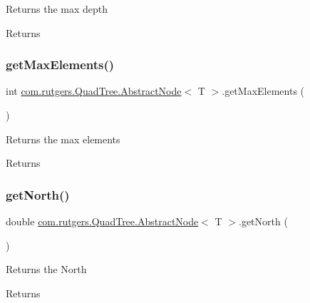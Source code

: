 Returns the max depth

\begin{DoxyReturn}{Returns}

\end{DoxyReturn}
\mbox{\label{classcom_1_1rutgers_1_1QuadTree_1_1AbstractNode_af9a2b6025ac383b8ca8fd480519cde8a}} 
\subsubsection{\texorpdfstring{get\+Max\+Elements()}{getMaxElements()}}
{\footnotesize\ttfamily int \hyperlink{classcom_1_1rutgers_1_1QuadTree_1_1AbstractNode}{com.\+rutgers.\+Quad\+Tree.\+Abstract\+Node}$<$ T $>$.get\+Max\+Elements (\begin{DoxyParamCaption}{ }\end{DoxyParamCaption})}

Returns the max elements

\begin{DoxyReturn}{Returns}

\end{DoxyReturn}
\mbox{\label{classcom_1_1rutgers_1_1QuadTree_1_1AbstractNode_a0008c92d400cabb75304a86f79ef5ae4}} 
\subsubsection{\texorpdfstring{get\+North()}{getNorth()}}
{\footnotesize\ttfamily double \hyperlink{classcom_1_1rutgers_1_1QuadTree_1_1AbstractNode}{com.\+rutgers.\+Quad\+Tree.\+Abstract\+Node}$<$ T $>$.get\+North (\begin{DoxyParamCaption}{ }\end{DoxyParamCaption})}

Returns the North

\begin{DoxyReturn}{Returns}

\end{DoxyReturn}


